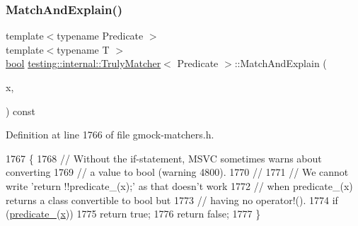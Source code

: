 \mbox{\label{classtesting_1_1internal_1_1TrulyMatcher_ad3781c661936a845ec165c1aad239634}} 
\subsubsection{\texorpdfstring{Match\+And\+Explain()}{MatchAndExplain()}}
{\footnotesize\ttfamily template$<$typename Predicate $>$ \\
template$<$typename T $>$ \\
\hyperlink{classbool}{bool} \hyperlink{classtesting_1_1internal_1_1TrulyMatcher}{testing\+::internal\+::\+Truly\+Matcher}$<$ Predicate $>$\+::Match\+And\+Explain (\begin{DoxyParamCaption}\item[{T \&}]{x,  }\item[{\hyperlink{classtesting_1_1MatchResultListener}{Match\+Result\+Listener} $\ast$}]{ }\end{DoxyParamCaption}) const\hspace{0.3cm}{\ttfamily [inline]}}



Definition at line 1766 of file gmock-\/matchers.\+h.


\begin{DoxyCode}
1767                                                      \{
1768     \textcolor{comment}{// Without the if-statement, MSVC sometimes warns about converting}
1769     \textcolor{comment}{// a value to bool (warning 4800).}
1770     \textcolor{comment}{//}
1771     \textcolor{comment}{// We cannot write 'return !!predicate\_(x);' as that doesn't work}
1772     \textcolor{comment}{// when predicate\_(x) returns a class convertible to bool but}
1773     \textcolor{comment}{// having no operator!().}
1774     \textcolor{keywordflow}{if} (\hyperlink{classtesting_1_1internal_1_1TrulyMatcher_a5697cfc685ae7c8c690838650bdd2d0c}{predicate\_}(\hyperlink{namespaceinteractive__marker_acda52804aef30b460a72fb21ee01d69d}{x}))
1775       \textcolor{keywordflow}{return} \textcolor{keyword}{true};
1776     \textcolor{keywordflow}{return} \textcolor{keyword}{false};
1777   \}
\end{DoxyCode}


